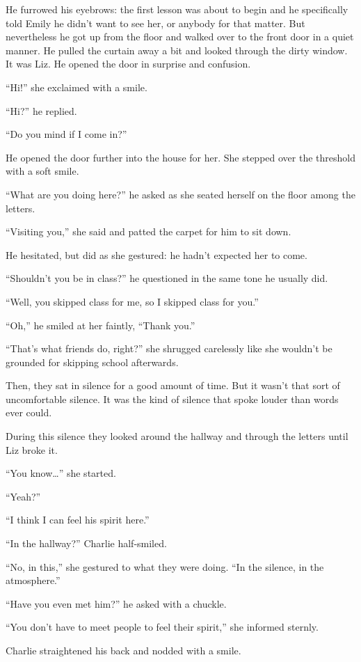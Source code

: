 He furrowed his eyebrows: the first lesson was about to begin and he specifically told Emily he didn't want to see her, or anybody for that matter. But nevertheless he got up from the floor and walked over to the front door in a quiet manner. He pulled the curtain away a bit and looked through the dirty window. It was Liz. He opened the door in surprise and confusion.

“Hi!” she exclaimed with a smile.

“Hi?” he replied.

“Do you mind if I come in?”

He opened the door further into the house for her. She stepped over the threshold with a soft smile.

“What are you doing here?” he asked as she seated herself on the floor among the letters.

“Visiting you,” she said and patted the carpet for him to sit down.

He hesitated, but did as she gestured: he hadn't expected her to come.

“Shouldn't you be in class?” he questioned in the same tone he usually did.

“Well, you skipped class for me, so I skipped class for you.”

“Oh,” he smiled at her faintly, “Thank you.”

“That's what friends do, right?” she shrugged carelessly like she wouldn't be grounded for skipping school afterwards.

Then, they sat in silence for a good amount of time. But it wasn't that sort of uncomfortable silence. It was the kind of silence that spoke louder than words ever could.

During this silence they looked around the hallway and through the letters until Liz broke it.

“You know…” she started.

“Yeah?”

“I think I can feel his spirit here.”

“In the hallway?” Charlie half-smiled.

“No, in this,” she gestured to what they were doing. “In the silence, in the atmosphere.”

“Have you even met him?” he asked with a chuckle.

“You don't have to meet people to feel their spirit,” she informed sternly.

Charlie straightened his back and nodded with a smile.

